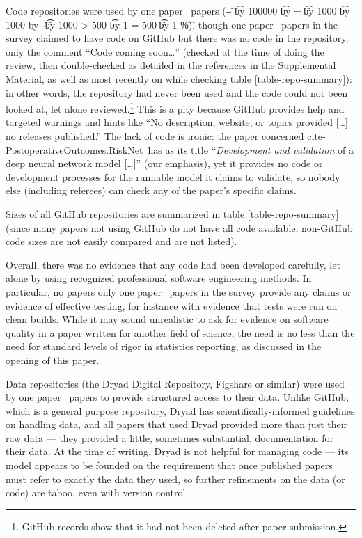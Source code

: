\documentclass[10pt,letterpaper]{article}
\def\pc#1#2{\t = #1%
\multiply \t by 100000%
\divide \t by #2%
\tu = \t
\divide \t by 1000%
\multiply \t by 1000%
\advance \tu by -\t%
\divide \t by 1000\relax%
\ifnum \tu > 500 %
	\advance \t by 1 
\else
	\ifnum \tu = 500 
		\ifodd \t %
			\advance \t by 1
		\else %
		\fi
	\fi
\fi
\the\t\%}
\def\plural#1#2{\ifnum #1=1 
	one #2%
\else
	\the#1\ #2s%
\fi}
\def\supplement{Supplemental Material}
\begin{document}
Code repositories were used by \plural{\countUsesVersionControlRepository}{paper} (\pc{\countUsesVersionControlRepository}{\dataN}), though \plural{\countNoCodeInRepo}{paper} in the survey claimed to have code on GitHub but there was no code in the repository, only the comment ``Code coming soon\ldots'' (checked at the time of doing the review, then double-checked as detailed in the references in the \supplement, as well as most recently on %
\def\clonedate {31 January 2022}
\def\cloneyear {2022}
\def\clonemonth {01}
while checking table \ref{table-repo-summary}): in other words, the repository had never been used and the code could not been looked at, let alone reviewed.\footnote{GitHub records show that it had not been deleted after paper submission.} This is a pity because GitHub provides help and targeted warnings and hints like ``No description, website, or topics provided [\ldots] no releases published.'' The lack of code is ironic: the paper concerned \csname cite-PostoperativeOutcomes.RiskNet\endcsname\ has as its title ``\emph{Development and validation\/} of a deep neural network model [\ldots]'' (our emphasis), yet it provides no code or development processes for the runnable model it claims to validate, so nobody else (including referees) can check any of the paper's specific claims.

Sizes of all GitHub repositories are summarized in table \ref{table-repo-summary} (since many papers not using GitHub do not have all code available, non-GitHub code sizes are not easily compared and are not listed). 

Overall, there was no evidence that any code had been developed carefully, {let alone by using recognized professional software engineering methods}. In particular, 
\ifnum {}
no papers
\else only \plural{\countCodetested}{paper}
\fi in the survey provide any claims or evidence of effective testing, for instance with evidence that tests were run on clean builds. {While it may sound unrealistic to ask for evidence on software quality in a paper written for another field of science, the need is no less than the need for standard levels of rigor in statistics reporting, as discussed in the opening of this paper.}

Data repositories (the Dryad Digital Repository, Figshare or similar) were used by \plural{\counthasDataRepository}{paper} to provide structured access to their data. Unlike GitHub, which is a general purpose repository, Dryad has scientifically-informed guidelines on handling data, and all papers that used Dryad provided more than just their raw data --- they provided a little, sometimes substantial, documentation for their data. At the time of writing, Dryad is not helpful for managing code --- its model appears to be founded on the requirement that once published papers must refer to exactly the data they used, so further refinements on the data (or code) are taboo, even with version control.
\end{document}
